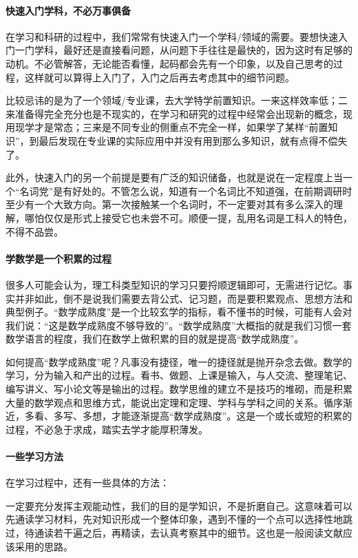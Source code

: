 \paragraph{快速入门学科，不必万事俱备}

在学习和科研的过程中，我们常常有快速入门一个学科/领域的需要。要想快速入门一门学科，最好还是直接看问题，从问题下手往往是最快的，因为这时有足够的动机。不必管解答，无论能否看懂，起码都会先有一个印象，以及自己思考的过程，这样就可以算得上入门了，入门之后再去考虑其中的细节问题。

比较忌讳的是为了一个领域/专业课，去大学特学前置知识。一来这样效率低；二来准备得完全充分也是不现实的，在学习和研究的过程中经常会出现新的概念，现用现学才是常态；三来是不同专业的侧重点不完全一样，如果学了某样“前置知识”，到最后发现在专业课的实际应用中并没有用到那么多知识，就有点得不偿失了。

此外，快速入门的另一个前提是要有广泛的知识储备，也就是说在一定程度上当一个“名词党”是有好处的。不管怎么说，知道有一个名词比不知道强，在前期调研时至少有一个大致方向。第一次接触某一个名词时，不一定要对其有多么深入的理解，哪怕仅仅是形式上接受它也未尝不可。顺便一提，乱用名词是工科人的特色，不得不品尝。

\paragraph{学数学是一个积累的过程}

很多人可能会认为，理工科类型知识的学习只要捋顺逻辑即可，无需进行记忆。事实并非如此，倒不是说我们需要去背公式、记习题，而是要积累观点、思想方法和典型例子。“数学成熟度”是一个比较玄学的指标，看不懂书的时候，可能有人会对我们说：“这是数学成熟度不够导致的”。“数学成熟度”大概指的就是我们习惯一套数学语言的程度，我们在数学上做积累的目的就是提高“数学成熟度”。

如何提高“数学成熟度”呢？凡事没有捷径，唯一的捷径就是抛开杂念去做。数学的学习，分为输入和产出的过程。看书、做题、上课是输入，与人交流、整理笔记、编写讲义、写小论文等是输出的过程。数学思维的建立不是技巧的堆砌，而是积累大量的数学观点和思维方式，能说出定理和定理、学科与学科之间的关系。循序渐近，多看、多写、多想，才能逐渐提高“数学成熟度”。这是一个或长或短的积累的过程，不必急于求成，踏实去学才能厚积薄发。

\paragraph{一些学习方法}

在学习过程中，还有一些具体的方法：

一定要充分发挥主观能动性，我们的目的是学知识，不是折磨自己。这意味着可以先通读学习材料，先对知识形成一个整体印象，遇到不懂的一个点可以选择性地跳过，待通读若干遍之后，再精读，去认真考察其中的细节。这也是一般阅读文献应该采用的思路。

